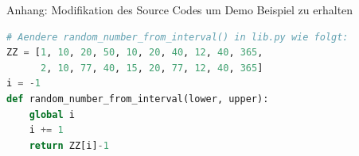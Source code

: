 \begin{frame}[fragile]{Anhang: Modifikation des Source Codes um Demo Beispiel zu erhalten}
  \begin{lstlisting}[language=python]
  # Aendere random_number_from_interval() in lib.py wie folgt:
ZZ = [1, 10, 20, 50, 10, 20, 40, 12, 40, 365,
      2, 10, 77, 40, 15, 20, 77, 12, 40, 365]
i = -1
def random_number_from_interval(lower, upper):
    global i
    i += 1
    return ZZ[i]-1
  \end{lstlisting}
\logopythonbottom
\end{frame}

